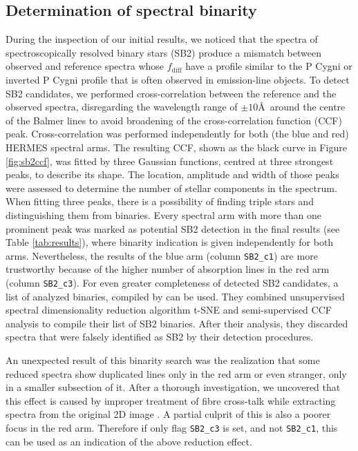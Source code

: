 \subsection{Determination of spectral binarity}
During the inspection of our initial results, we noticed that the spectra of spectroscopically resolved binary stars (SB2) produce a mismatch between observed and reference spectra whose $f_\mathrm{diff}$ have a profile similar to the P Cygni or inverted P Cygni profile \citep{1979ApJS...39..481C} that is often observed in emission-line objects. To detect SB2 candidates, we performed cross-correlation between the reference and the observed spectra, disregarding the wavelength range of $\pm10$\AA\ around the centre of the Balmer lines to avoid broadening of the cross-correlation function (CCF) peak. Cross-correlation was performed independently for both (the blue and red) HERMES spectral arms. The resulting CCF, shown as the black curve in Figure \ref{fig:sb2ccf}, was fitted by three Gaussian functions, centred at three strongest peaks, to describe its shape. The location, amplitude and width of those peaks were assessed to determine the number of stellar components in the spectrum. When fitting three peaks, there is a possibility of finding triple stars and distinguishing them from binaries. Every spectral arm with more than one prominent peak was marked as potential SB2 detection in the final results (see Table \ref{tab:results}), where binarity indication is given independently for both arms. Nevertheless, the results of the blue arm (column \texttt{SB2\_c1}) are more trustworthy because of the higher number of absorption lines in the red arm (column \texttt{SB2\_c3}). For even greater completeness of detected SB2 candidates, a list of analyzed binaries, compiled by \cite{2020arXiv200500014T} can be used. They combined unsupervised spectral dimensionality reduction algorithm t-SNE and semi-supervised CCF analysis \citep{2017A&A...608A..95M} to compile their list of SB2 binaries. After their analysis, they discarded spectra that were falsely identified as SB2 by their detection procedures.

An unexpected result of this binarity search was the realization that some reduced spectra show duplicated lines only in the red arm or even stranger, only in a smaller subsection of it. After a thorough investigation, we uncovered that this effect is caused by improper treatment of fibre cross-talk while extracting spectra from the original 2D image \citep{2017MNRAS.464.1259K}. A partial culprit of this is also a poorer focus in the red arm. Therefore if only flag \texttt{SB2\_c3} is set, and not \texttt{SB2\_c1}, this can be used as an indication of the above reduction effect.

